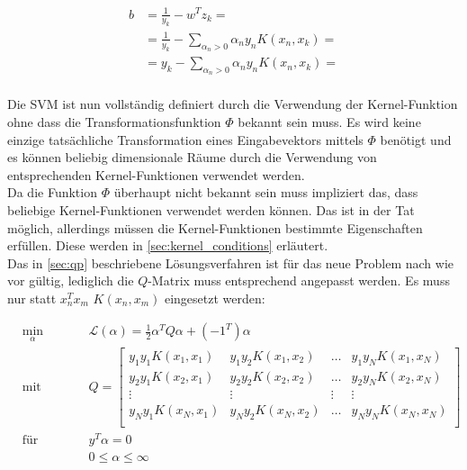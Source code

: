 \documentclass[a4paper,11pt,twoside]{scrreprt}
\newcommand{\Lagr}{\mathcal{L}}
\begin{document}
\begin{equation}
	\begin{aligned}
		b &= \frac{1}{y_{k}} - w^{T} z_{k} = \\
		&= \frac{1}{y_{k}} - \sum_{\alpha_{n} > 0} \alpha_{n} y_{n} K(x_{n}, x_{k}) = \\
		&= y_{k} - \sum_{\alpha_{n} > 0} \alpha_{n} y_{n} K(x_{n}, x_{k}) = \\
	\end{aligned}
\end{equation}

Die \ac{SVM} ist nun vollständig definiert durch die Verwendung der Kernel-Funktion ohne dass die Transformationsfunktion $\Phi$ bekannt sein muss. Es wird keine einzige tatsächliche Transformation eines Eingabevektors mittels $\Phi$ benötigt und es können beliebig dimensionale Räume durch die Verwendung von entsprechenden Kernel-Funktionen verwendet werden. \\

Da die Funktion $\Phi$ überhaupt nicht bekannt sein muss impliziert das, dass beliebige Kernel-Funktionen verwendet werden können. Das ist in der Tat möglich, allerdings müssen die Kernel-Funktionen bestimmte Eigenschaften erfüllen. Diese werden in \autoref{sec:kernel_conditions} erläutert.\\

Das in \autoref{sec:qp} beschriebene Lösungsverfahren ist für das neue Problem nach wie vor gültig, lediglich die $Q$-Matrix muss entsprechend angepasst werden. Es muss nur statt $x_{n}^{T}x_{m}$ $K(x_{n}, x_{m})$ eingesetzt werden:

\begin{subequations} \label{qp1}
	\begin{alignat}{2}
		&\!\min_{\alpha}        &\qquad& \Lagr(\alpha) = \frac{1}{2} \alpha^{T} Q \alpha + (-1^T) \alpha \label{eq:qp1}\\
		&\text{mit} &      & Q = \begin{bmatrix} 
			y_{1}y_{1} K(x_{1}, x_{1}) & y_{1}y_{2} K(x_{1}, x_{2}) & \dots & y_{1}y_{N} K(x_{1}, x_{N})\\
			y_{2}y_{1} K(x_{2}, x_{1}) & y_{2}y_{2} K(x_{2}, x_{2}) & \dots & y_{2}y_{N} K(x_{2}, x_{N})\\
			\vdots & \vdots & \vdots & \vdots\\
			y_{N}y_{1} K(x_{N}, x_{1}) & y_{N}y_{2} K(x_{N}, x_{2}) & \dots & y_{N}y_{N} K(x_{N}, x_{N})\\ 
		\end{bmatrix}\\
		&\text{für} & & y^{T} \alpha = 0\\
		& & & 0 \leq \alpha \leq \infty
	\end{alignat}
\end{subequations} 
\end{document}

